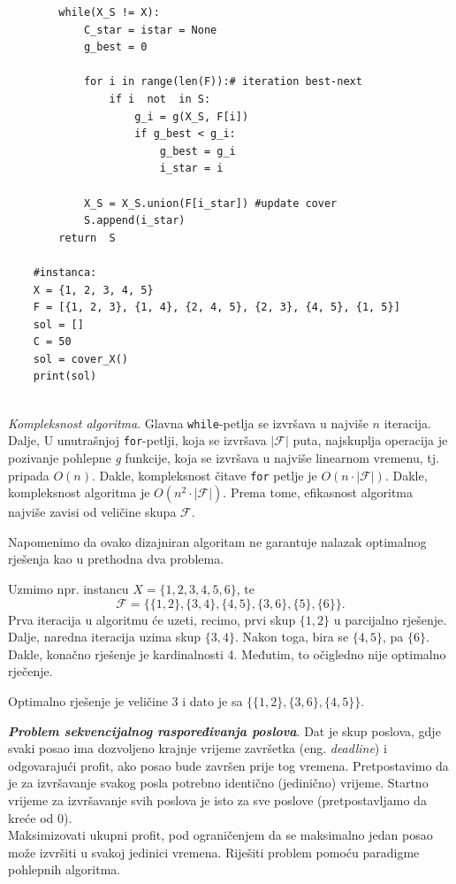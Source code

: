 \begin{solution}
\begin{verbatim}
		while(X_S != X):
			C_star = istar = None
			g_best = 0
	
			for i in range(len(F)):# iteration best-next
				if i  not  in S: 
					g_i = g(X_S, F[i])
					if g_best < g_i:
						g_best = g_i
						i_star = i
	
			X_S = X_S.union(F[i_star]) #update cover
			S.append(i_star)
		return  S            
	
	#instanca: 
	X = {1, 2, 3, 4, 5}
	F = [{1, 2, 3}, {1, 4}, {2, 4, 5}, {2, 3}, {4, 5}, {1, 5}]
	sol = []
	C = 50
	sol = cover_X()
	print(sol)
	
\end{verbatim}

\textit{Kompleksnost algoritma}. Glavna \texttt{while}-petlja se izvršava u najviše $n$ iteracija. Dalje, U unutrašnjoj \texttt{for}-petlji, koja se izvršava  $ |\mathcal{F}|$ puta, najskuplja operacija je pozivanje pohlepne \textit{g} funkcije, koja se izvršava u   najviše linearnom vremenu, tj. pripada $O(n)$. Dakle, kompleksnost čitave \texttt{for} petlje je $O(n \cdot  |\mathcal{F} |)$. Dakle, kompleksnost algoritma je $O(n^2 \cdot  |\mathcal{F} |)$. Prema tome, efikasnost algoritma najviše zavisi od veličine skupa $\mathcal{F}$. 

Napomenimo da ovako dizajniran algoritam ne garantuje nalazak optimalnog rješenja  kao u prethodna dva problema. 


  Uzmimo npr. instancu $X= \{1, 2, 3, 4, 5, 6\}$, te $$\mathcal{F}= \{\{1,2\}, \{3, 4\}, \{4, 5\}, \{3, 6\}, \{5\}, \{6\} \}.$$   
  Prva iteracija u algoritmu će uzeti, recimo, prvi skup $\{1, 2\}$ u parcijalno rješenje. Dalje, naredna iteracija uzima skup $\{3, 4\}$. Nakon toga, bira se $\{4, 5\}$, pa $\{6\}$. Dakle, konačno rješenje je kardinalnosti 4. Međutim, to očigledno nije optimalno rječenje. 
  
  Optimalno rješenje   je veličine 3 i dato je sa $\{ \{1, 2\}, \{3, 6\}, \{4,5\}\}$.  
	 
\end{solution}

\begin{example}  \textbf{\textit{Problem sekvencijalnog raspoređivanja poslova}}. Dat je skup  poslova, gdje svaki posao ima dozvoljeno krajnje
	vrijeme završetka (eng. \textit{deadline}) i odgovarajući profit, ako  posao bude završen 
	prije tog vremena. Pretpostavimo da je za izvršavanje svakog posla  potrebno identično (jedinično)
	vrijeme. Startno vrijeme za izvršavanje svih poslova je isto za sve poslove (pretpostavljamo da kreće od 0). \\
	
	  Maksimizovati ukupni profit, pod ograničenjem da se maksimalno jedan
	posao može izvršiti u svakoj jedinici vremena. Riješiti problem pomoću paradigme pohlepnih algoritma. 
\end{example} 

